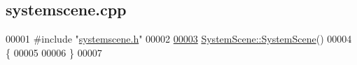 \hypertarget{systemscene_8cpp_source}{}\subsection{systemscene.\+cpp}
\label{systemscene_8cpp_source}

\begin{DoxyCode}
00001 \textcolor{preprocessor}{#include "\hyperlink{systemscene_8h}{systemscene.h}"}
00002 
\hypertarget{systemscene_8cpp_source_l00003}{}\hyperlink{class_system_scene_af166acf8b3cc3a698ced208c303bc03d}{00003} \hyperlink{class_system_scene_af166acf8b3cc3a698ced208c303bc03d}{SystemScene::SystemScene}()
00004 \{
00005   
00006 \}
00007 
\end{DoxyCode}
